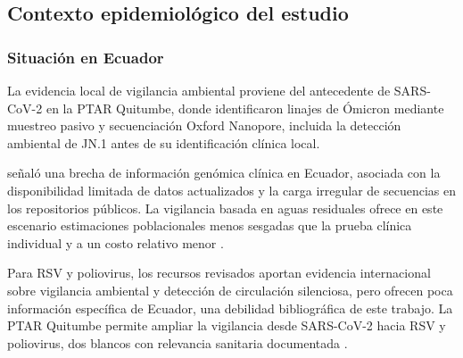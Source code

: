 \subsection{Contexto epidemiológico del estudio}

\subsubsection{Situación en Ecuador}

La evidencia local de vigilancia ambiental proviene del antecedente de SARS-CoV-2 en la PTAR Quitumbe, donde  identificaron linajes de Ómicron mediante muestreo pasivo y secuenciación Oxford Nanopore, incluida la detección ambiental de JN.1 antes de su identificación clínica local.

 señaló una brecha de información genómica clínica en Ecuador, asociada con la disponibilidad limitada de datos actualizados y la carga irregular de secuencias en los repositorios públicos. La vigilancia basada en aguas residuales ofrece en este escenario estimaciones poblacionales menos sesgadas que la prueba clínica individual y a un costo relativo menor \cite{Karthikeyan_2022}.

Para RSV y poliovirus, los recursos revisados aportan evidencia internacional sobre vigilancia ambiental y detección de circulación silenciosa, pero ofrecen poca información específica de Ecuador, una debilidad bibliográfica de este trabajo. La PTAR Quitumbe permite ampliar la vigilancia desde SARS-CoV-2 hacia RSV y poliovirus, dos blancos con relevancia sanitaria documentada \cite{Asghar_2014,Hughes_2022,Bottcher_2025}.